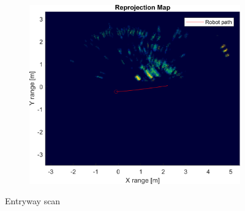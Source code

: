 \begin{figure}[htbp]
\begin{subfigure}[t]{0.5\linewidth}
        \includegraphics[width=\linewidth,max height=.475\textheight]{gfx/results/entryway_reprojection.png}
    \end{subfigure}%
    \caption{Entryway scan}
\end{figure}

